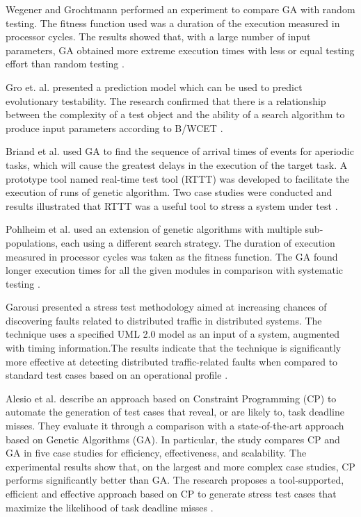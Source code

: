 \documentclass{bmcart}
\begin{document}
Wegener and Grochtmann performed an  experiment
to compare GA with random testing. The fitness function used was a duration of the execution measured in processor cycles.  The results showed that, with a large number of input parameters, GA obtained more extreme execution times with less or equal testing effort than random testing \citep{J.WegenerK.GrimmM.GrochtmannH.Sthamer1996} \citep{Wegener1998}.


Gro et. al. \citep{Gross2000} presented a prediction model  which can be used to predict evolutionary testability. The research confirmed that there is a relationship between the complexity of a test object and the ability of a search algorithm to produce input parameters according to B/WCET \citep{Gross2000}. 

Briand et al. \citep{Briand2005} used GA to find the sequence of arrival times of events for aperiodic tasks, which will cause the greatest delays in the execution of the target task. A prototype tool named real-time test tool (RTTT) was developed to facilitate the execution of runs of genetic algorithm. Two case studies were conducted and results illustrated that RTTT was a useful tool to stress a system under test \citep{Briand2005}.


Pohlheim et al. used an extension of genetic algorithms with multiple sub-populations, each using a different search strategy. The duration of execution measured in processor cycles was taken as the fitness
function. The GA found longer execution times for all the given modules in comparison with systematic testing \citep{Pohlheim2005}.

Garousi presented a stress test methodology aimed at increasing chances of discovering faults related to distributed traffic in distributed systems. The technique uses a specified UML 2.0 model as an input of a system, augmented with timing information.The results indicate that the technique is significantly more effective at detecting distributed traffic-related faults when compared to standard test cases based on an operational profile \citep{Garousi2006}.

Alesio et al. describe an approach based
on Constraint Programming (CP) to automate the generation of test cases that reveal, or are likely to, task deadline misses. They evaluate it through a comparison with a state-of-the-art approach based on Genetic Algorithms (GA). In particular, the study compares CP and GA in five case studies for efficiency, effectiveness, and scalability. The experimental results show that, on the largest and more complex case studies, CP performs significantly better than GA. The research proposes a tool-supported, efficient and effective approach based on CP to generate stress test cases that maximize the likelihood of task deadline misses \citep{DiAlesio2013}.
\end{document}
